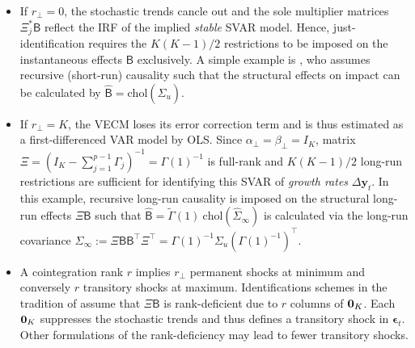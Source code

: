 \begin{itemize}
	\item If $ r_\perp = 0 $, the stochastic trends cancle out and the sole multiplier matrices $ \Xi_j^* \mathsf{B} $ reflect the IRF of the implied \textit{stable} SVAR model. Hence, just-identification requires the $ K(K-1)/2 $ restrictions to be imposed on the instantaneous effects $\mathsf{B} $ exclusively. A simple example is \cite{Sims1980}, who assumes recursive (short-run) causality such that the structural effects on impact can be calculated by $ \widehat{\textsf{B}} = \text{chol} \left( \widehat{\Sigma}_{u} \right) $.
	
	\item If $ r_\perp = K $, the VECM loses its error correction term and is thus estimated as a first-differenced VAR model by OLS. Since $ \alpha_\perp = \beta_\perp = I_K $, matrix $ \Xi = \left(I_K - \sum_{j=1}^{p-1} \Gamma_{j} \right)^{-1} = \Gamma(1)^{-1} $ is full-rank and $ K(K-1)/2 $ long-run restrictions are sufficient for identifying this SVAR of \textit{growth rates} $ \Delta \boldsymbol{y}_{t} $. In this example, recursive long-run causality is imposed on the structural long-run effects $ \Xi \mathsf{B} $ such that $ \widehat{\textsf{B}} = \widetilde{\Gamma}(1) \ \text{chol}\left( \widehat{\Sigma}_{\infty} \right) $ is calculated via the long-run covariance $ \Sigma_\infty := \Xi \mathsf{B} \mathsf{B}^\top\Xi^\top = \Gamma(1)^{-1} \Sigma_u \left( \Gamma(1)^{-1} \right)^\top$. 
	
	\item A cointegration rank $ r $ implies $ r_\perp $ permanent shocks at minimum and conversely $ r $ transitory shocks at maximum. Identifications schemes in the tradition of \citet{KingEtAl1991} assume that $ \Xi \mathsf{B} $ is rank-deficient due to $ r $ columns of $ {\bf 0}_K $. Each $ {\bf 0}_K $ suppresses the stochastic trends and thus defines a transitory shock in $ \boldsymbol{\epsilon}_{t} $. Other formulations of the rank-deficiency may lead to fewer transitory shocks.
\end{itemize} 


